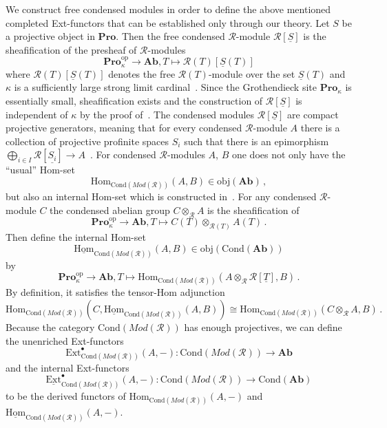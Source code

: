 \documentclass[12pt,a4paper]{article}
\numberwithin{equation}{section}
\theoremstyle{nonumberplain}
\begin{document}
We construct free condensed modules in order to define the above mentioned completed Ext-functors that can be established only through our theory. Let $S$ be a projective object in $\mathbf{Pro}$. Then the free condensed $\mathcal{R}$-module $\mathcal{R}[\underline{S}]$ is the sheafification of the presheaf of $\mathcal{R}$-modules
\[ \mathbf{Pro}_{\kappa}^{\mathrm{op}} \rightarrow \mathbf{Ab}, T \mapsto \mathcal{R}(T)[\underline{S}(T)] \]
where $\mathcal{R}(T)[\underline{S}(T)]$ denotes the free $\mathcal{R}(T)$-module over the set $\underline{S}(T)$ and $\kappa$ is a sufficiently large strong limit cardinal~\cite[p.~12]{sch19}. Since the Grothendieck site $\mathbf{Pro}_{\kappa}$ is essentially small, sheafification exists and the construction of $\mathcal{R}[\underline{S}]$ is independent of $\kappa$ by the proof of~\cite[Proposition~2.9]{sch19}. The condensed modules $\mathcal{R}[\underline{S}]$ are compact projective generators, meaning that for every condensed $\mathcal{R}$-module $A$ there is a collection of projective profinite spaces $S_i$ such that there is an epimorphism $\bigoplus_{i \in I} \mathcal{R}[\underline{S_i}] \rightarrow A$~\cite[p.~12]{sch19}. For condensed $\mathcal{R}$-modules $A$, $B$ one does not only have the ``usual'' Hom-set
\[ \mathrm{Hom}_{\mathrm{Cond}(Mod(\mathcal{R}))}(A, B) \in \mathrm{obj}(\mathbf{Ab}) \, , \]
but also an internal Hom-set which is constructed in~\cite[p.~13]{sch19}. For any condensed $\mathcal{R}$-module $C$ the condensed abelian group $C \otimes_{\mathcal{R}} A$ is the sheafification of
\[ \mathbf{Pro}_{\kappa}^{\mathrm{op}} \rightarrow \mathbf{Ab}, T \mapsto C(T) \otimes_{\mathcal{R}(T)} A(T) \, . \]
Then define the internal Hom-set
\[ \underline{\mathrm{Hom}}_{\mathrm{Cond}(Mod(\mathcal{R}))}(A, B) \in \mathrm{obj}(\mathrm{Cond}(\mathbf{Ab})) \]
by
\[ \mathbf{Pro}_{\kappa}^{\mathrm{op}} \rightarrow \mathbf{Ab}, T \mapsto \mathrm{Hom}_{\mathrm{Cond}(Mod(\mathcal{R}))}(A \otimes_{\mathcal{R}} \mathcal{R}[\underline{T}], B) \, . \]
By definition, it satisfies the tensor-Hom adjunction
\[ \mathrm{Hom}_{\mathrm{Cond}(Mod(\mathcal{R}))}(C, \underline{\mathrm{Hom}}_{\mathrm{Cond}(Mod(\mathcal{R}))}(A, B)) \cong \mathrm{Hom}_{\mathrm{Cond}(Mod(\mathcal{R}))}(C \otimes_{\mathcal{R}} A, B) \, . \]
Because the category $\mathrm{Cond}(Mod(\mathcal{R}))$ has enough projectives, we can define the unenriched Ext-functors
\[ \mathrm{Ext}_{\mathrm{Cond}(Mod(\mathcal{R}))}^{\bullet}(A, -): \mathrm{Cond}(Mod(\mathcal{R})) \rightarrow \mathbf{Ab} \]
and the internal Ext-functors
\[ \underline{\mathrm{Ext}}_{\mathrm{Cond}(Mod(\mathcal{R}))}^{\bullet}(A, -): \mathrm{Cond}(Mod(\mathcal{R})) \rightarrow \mathrm{Cond}(\mathbf{Ab}) \]
to be the derived functors of $\mathrm{Hom}_{\mathrm{Cond}(Mod(\mathcal{R}))}(A, -)$ and $\underline{\mathrm{Hom}}_{\mathrm{Cond}(Mod(\mathcal{R}))}(A, -)$. \\
\end{document}
